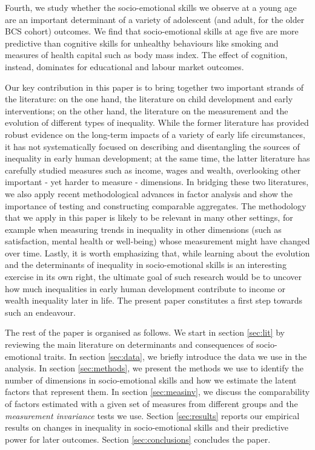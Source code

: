 Fourth, we study whether the socio-emotional skills we observe at a young age are an important determinant of a variety of adolescent (and adult, for the older BCS cohort) outcomes. We find that socio-emotional skills at age five are more predictive than cognitive skills for unhealthy behaviours like smoking and measures of health capital such as body mass index. The effect of cognition, instead, dominates for educational and labour market outcomes.

Our key contribution in this paper is to bring together two important strands of the literature: on the one hand, the literature on child development and early interventions; on the other hand, the literature on the measurement and the evolution of different types of inequality. While the former literature has provided robust evidence on the long-term impacts of a variety of early life circumstances, it has not systematically focused on describing and disentangling the sources of inequality in early human development; at the same time, the latter literature has carefully studied measures such as income, wages and wealth, overlooking other important - yet harder to measure - dimensions. In bridging these two literatures, we also apply recent methodological advances in factor analysis and show the importance of testing and constructing comparable aggregates. The methodology that we apply in this paper is likely to be relevant in many other settings, for example when measuring trends in inequality in other dimensions (such as satisfaction, mental health or well-being) whose measurement might have changed over time. Lastly, it is worth emphasizing that, while learning about the evolution and the determinants of inequality in socio-emotional skills is an interesting exercise in its own right, the ultimate goal of such research would be to uncover how much inequalities in early human development contribute to income or wealth inequality later in life. The present paper constitutes a first step towards such an endeavour.

The rest of the paper is organised as follows. We start in section \ref{sec:lit} by reviewing the main literature on determinants and consequences of socio-emotional traits. In section \ref{sec:data}, we briefly introduce the data we use in the analysis. In section \ref{sec:methods}, we present the methods we use to identify the number of dimensions in socio-emotional skills and how we estimate the latent factors that represent them. In section \ref{sec:measinv}, we discuss the comparability of factors estimated with a given set of measures from different groups and the \emph{measurement invariance} tests we use. Section \ref{sec:results} reports our empirical results on changes in inequality in socio-emotional skills and their predictive power for later outcomes. Section \ref{sec:conclusions} concludes the paper.

